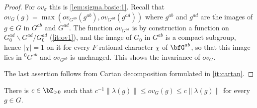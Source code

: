\documentclass[12pt,a4paper]{amsart}%
\newcommand{\RamiC}[1]{{{#1}}}
\begin{document}
\begin{proof}
For $ov_\sigma$ this is \eqref{lem:sigma.basic:1}. \RamiC{Recall that
$ov_G(g)=\max(ov_{G^{ab}}(g^{ab}),ov_{G^{ad}}(g^{ad}))$ where $g^{ab}$ and $g^{ad}$ are the images of $g \in G$ in $G^{ab}$ and $G^{ad}$.}
The function
$ov_{G^{ad}}$ is by construction a function on $G_0^{ad}\backslash G^{ad}/G_0^{ad}$
(\eqref{it:ov1}), and the image of $G_0$ in $G^{ab}$ is a compact subgroup,
hence $|\chi|=1$ on it for every $F$-rational character $\chi$ of $\bfG^{ab}$, so that this image
lies in ${}^0G^{ab}$ and $ov_{G^{ab}}$ is unchanged. This shows the invariance of $ov_G$.

The last assertion follows from \RamiC{Cartan decomposition formulated in}
\eqref{it:cartan}.
\end{proof}

\begin{lemma}\label{lem:ov.G.comp}
There is $c\in\Z_{>0}$ such that $c^{-1}\|\lambda(g)\|\leq ov_G(g)\leq c\|\lambda(g)\|$ for every
$g\in G$.
\end{lemma}
\end{document}
